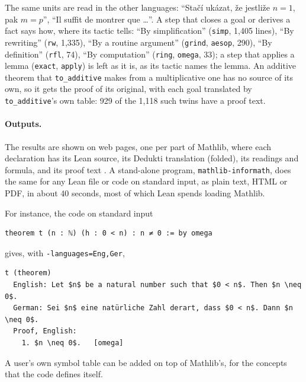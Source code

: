 \documentclass{easychair}
\newcommand{\ttt}[1]{\texttt{#1}}
\begin{document}
The same units are read in the other languages: ``Stačí ukázat, že jestliže $n = 1$, pak
$m = p$'', ``Il suffit de montrer que \ldots''. A step that closes a goal or derives a fact says
how, where its tactic tells: ``By simplification'' (\ttt{simp}, 1,405 lines), ``By rewriting''
(\ttt{rw}, 1,335), ``By a routine argument'' (\ttt{grind}, \ttt{aesop}, 290), ``By definition''
(\ttt{rfl}, 74), ``By computation'' (\ttt{ring}, \ttt{omega}, 33); a step that applies a lemma
(\ttt{exact}, \ttt{apply}) is left as it is, as its tactic names the lemma. An additive theorem
that \ttt{to\_additive} makes from a multiplicative one has no source of its own, so it gets the
proof of its original, with each goal translated by \ttt{to\_additive}'s own table: 929 of the
1,118 such twins have a proof text.

\paragraph{Outputs.} The results are shown on web pages, one per part of Mathlib, where each
declaration has its Lean source, its Dedukti translation (folded), its readings and formula,
and its proof text \cite{mathlib-informath}. A stand-alone program, \ttt{mathlib-informath},
does the same for any Lean file or code on standard input, as plain text, HTML or PDF, in about
40 seconds, most of which Lean spends loading Mathlib.

For instance, the code on standard input
\begin{lstlisting}
theorem t (n : ℕ) (h : 0 < n) : n ≠ 0 := by omega
\end{lstlisting}
gives, with \ttt{-languages=Eng,Ger},
\begin{lstlisting}
t (theorem)
  English: Let $n$ be a natural number such that $0 < n$. Then $n \neq 0$.
  German: Sei $n$ eine natürliche Zahl derart, dass $0 < n$. Dann $n \neq 0$.
  Proof, English:
    1. $n \neq 0$.   [omega]
\end{lstlisting}
A user's own symbol table can be added on top of Mathlib's, for the concepts that the code
defines itself.
\end{document}
